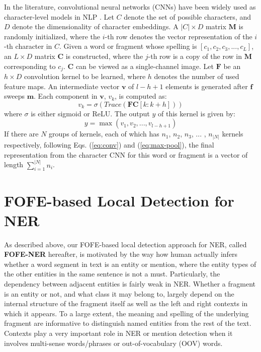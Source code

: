 \documentclass[11pt,a4paper]{article}
\begin{document}
In the literature, convolutional neural networks (CNNs) have been widely used as character-level models in NLP \cite{kim2015character}. 
Let $C$ denote the set of possible characters, and $D$ denote the dimensionality of character embeddings.
A $|C| \times D$ matrix $\bm{M}$ is randomly initialized, where the $i$-th row denotes the vector representation of the $i$-th character in $C$. Given a word or fragment whose spelling is $[c_1, c_2, c_3, ..., c_L]$, 
an $L \times D$ matrix $\bm{C}$ is constructed,  where the $j$-th row is a copy of the row in  $\bm{M}$ corresponding to $c_j$. $\bm{C}$ can be viewed as a single-channel image. 
Let $\bm{F}$ be an $h \times D$ convolution kernel to be learned,  where $h$ denotes the number of used feature maps. 
An intermediate vector $\bm{v}$ of $l-h+1$ elements is generated after $\bm{f}$ sweeps $\bm{m}$. Each component in $\bm{v}$,  $v_k$,  is computed as:
\begin{equation}
\label{eq:conv}
v_k = \sigma(Trace(\bm{F}\bm{C}[k:k+h]))
\end{equation}
where $\sigma$ is either sigmoid or ReLU.
The output  $y$ of this kernel is given by:
\begin{equation}
\label{eq:max-pool}
y = \max(v_1, v_2, ..., v_{l-h+1})
\end{equation}
If there are $N$ groups of kernels, each of which has $n_1$, $n_2$, $n_3$, ... , ${n_{|N|}}$ kernels respectively,
following Eqs. (\ref{eq:conv}) and (\ref{eq:max-pool}), the final representation from the character CNN for this word or fragment is a vector of length $\sum_{i=1}^{|N|} n_{i}$.

\section{FOFE-based Local Detection for NER}

As described above, our FOFE-based local detection approach for NER, called  \textbf{FOFE-NER} hereafter, 
is motivated by the way how human actually infers whether a word segment in text is an entity or mention, where  
the entity types of the other entities in the same sentence is not a must.
Particularly, the dependency between adjacent entities is fairly weak in NER. 
Whether a fragment is an entity or not, and what class it may belong to, largely depend on
the internal structure of the fragment itself as well as the left and right contexts  in which it appears. 
To a large extent, the meaning and spelling of the underlying fragment 
are informative to distinguish named entities from the rest of the text. 
Contexts play a very important role in NER or mention detection 
when it involves multi-sense words/phrases or out-of-vocabulary (OOV) words. 
\end{document}
